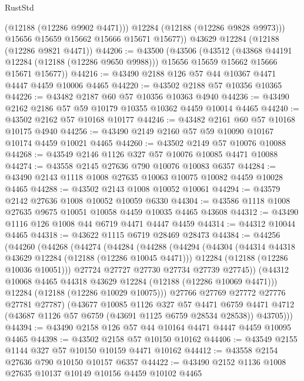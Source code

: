\begin{lexlean}{RustStd}
\begin{coremodule}
            (@12188 (@12286 @9902 @4471)))
          @12284
          (@12188 (@12286 @9828 @9973)))
        @15656
        @15659
        @15662
        @15666
        @15671
        @15677))
    @43629
    @12284
    (@12188 (@12286 @9821 @4471))
@44206 := @43500
    (@43506
      (@43512
        (@43868 @44191 @12284 (@12188 (@12286 @9650 @9988)))
        @15656
        @15659
        @15662
        @15666
        @15671
        @15677))
@44216 := @43490 @2188 @126 @57 @44 @10367 @4471 @4447 @4459 @10006 @4465
@44220 := @43502 @2188 @57 @10356 @10365
@44226 := @43482 @2187 @60 @57 @10356 @10363 @4940
@44236 := @43490 @2162 @2186 @57 @59 @10179 @10355 @10362 @4459 @10014 @4465
@44240 := @43502 @2162 @57 @10168 @10177
@44246 := @43482 @2161 @60 @57 @10168 @10175 @4940
@44256 := @43490 @2149 @2160 @57 @59 @10090 @10167 @10174 @4459 @10021 @4465
@44260 := @43502 @2149 @57 @10076 @10088
@44268 := @43549 @2146 @1126 @327 @57 @10076 @10085 @4471 @10088
@44274 := @43558 @2145 @27636 @790 @10076 @10083 @6357
@44284 := @43490 @2143 @1118 @1008 @27635 @10063 @10075 @10082 @4459 @10028 @4465
@44288 := @43502 @2143 @1008 @10052 @10061
@44294 := @43579 @2142 @27636 @1008 @10052 @10059 @6330
@44304 := @43586 @1118 @1008 @27635 @9675 @10051 @10058 @4459 @10035 @4465 @43608
@44312 := @43490 @1116 @126 @1008 @44 @6719 @4471 @4447 @4459
@44314 := @44312 @10044 @4465
@44318 := @43622 @1115 @6719 @28469 @28473
@44384 := @44256
    (@44260
      (@44268
        (@44274
          (@44284
            (@44288
              (@44294
                (@44304
                  (@44314 @44318 @43629 @12284 (@12188 (@12286 @10045 @4471)))
                  @12284
                  (@12188 (@12286 @10036 @10051)))
                @27724
                @27727
                @27730
                @27734
                @27739
                @27745))
            (@44312 @10068 @4465 @44318 @43629 @12284 (@12188 (@12286 @10069 @4471)))
            @12284
            (@12188 (@12286 @10029 @10075)))
          @27766
          @27769
          @27772
          @27776
          @27781
          @27787)
        (@43677
          @10085
          @1126
          @327
          @57
          @4471
          @6759
          @4471
          @4712
          (@43687 @1126 @57 @6759 (@43691 @1125 @6759 @28534 @28538))
          @43705)))
@44394 := @43490 @2158 @126 @57 @44 @10164 @4471 @4447 @4459 @10095 @4465
@44398 := @43502 @2158 @57 @10150 @10162
@44406 := @43549 @2155 @1144 @327 @57 @10150 @10159 @4471 @10162
@44412 := @43558 @2154 @27636 @790 @10150 @10157 @6357
@44422 := @43490 @2152 @1136 @1008 @27635 @10137 @10149 @10156 @4459 @10102 @4465

\end{coremodule}
\end{lexlean}
